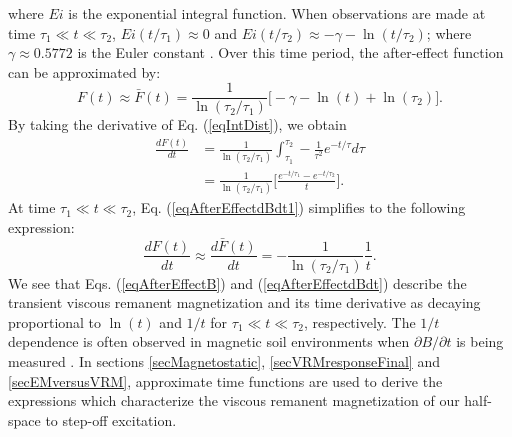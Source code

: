 \documentclass[onecolumn]{IEEEtran} %
\begin{document}
where $Ei$ is the  exponential integral function. When observations
are made at time $\tau_1 \ll t \ll \tau_2$, $Ei (t/\tau_1) \approx
0$ and $Ei (t/\tau_2) \approx -\gamma - \ln(t/\tau_2)$; where
$\gamma \approx 0.5772$ is the Euler constant \cite{Pasion2007}.
Over this time period, the after-effect function can be approximated
by:
\begin{equation}
\label{eqAfterEffectB} F(t) \approx \bar F(t) =
\frac{1}{\ln(\tau_2/\tau_1)} \big [ - \gamma - \ln(t) + \ln(\tau_2)
\big ].
\end{equation}
By taking the derivative of Eq. (\ref{eqIntDist}), we obtain
\begin{align}
\label{eqAfterEffectdBdt1}
\frac{d F(t)}{dt} &= \frac{1}{\ln(\tau_2/\tau_1)} \int^{\tau_2}_{\tau_1} - \frac{1}{\tau^2} e^{-t/\tau} d \tau \nonumber \\
& = \frac{1}{\ln(\tau_2/\tau_1)} \Bigg [ \frac{e^{-t/\tau_1}
-e^{-t/\tau_2} }{t} \Bigg ].
\end{align}
At time $\tau_1 \ll t \ll \tau_2$, Eq. (\ref{eqAfterEffectdBdt1}) simplifies to the following expression:
\begin{equation}
\label{eqAfterEffectdBdt} \frac{dF(t)}{d t} \approx \frac{d \bar
F(t)}{d t} = -\frac{1}{\ln(\tau_2/\tau_1)} \frac{1}{t}.
\end{equation}
We see that Eqs. (\ref{eqAfterEffectB}) and
(\ref{eqAfterEffectdBdt}) describe the transient  viscous remanent 
magnetization and its time derivative as decaying proportional to $\ln(t)$
and $1/t$ for $\tau_1 \ll t \ll \tau_2$, respectively. The $1/t$
dependence is often observed in magnetic soil environments when
$\partial B/\partial t$ is being measured
\cite{Dabas1992,Buselli1982,Pasion2007}. In sections \ref{secMagnetostatic}, \ref{secVRMresponseFinal} and \ref{secEMversusVRM},
approximate time functions are used to derive the expressions which
characterize the viscous remanent magnetization of our
half-space to step-off excitation.



\end{document}
